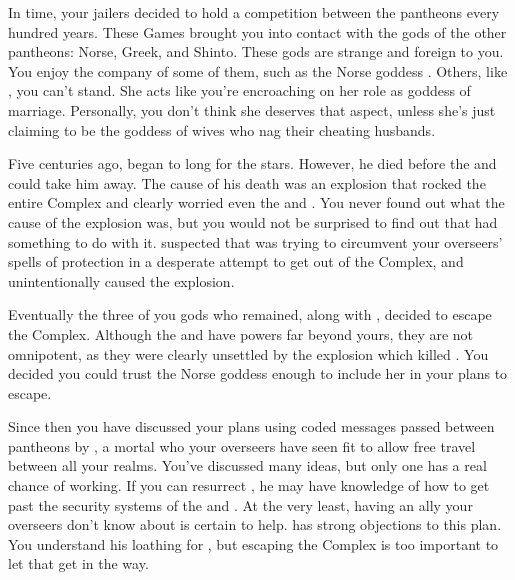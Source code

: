 \documentclass[char]{guardians}
\begin{document}

In time, your jailers decided to hold a competition between the pantheons every hundred years. These Games brought you into contact with the gods of the other pantheons: Norse, Greek, and Shinto. These gods are strange and foreign to you. You enjoy the company of some of them, such as the Norse goddess \cHel{}. Others, like \cHera{}, you can't stand. She acts like you're encroaching on her role as goddess of marriage. Personally, you don't think she deserves that aspect, unless she's just claiming to be the goddess of wives who nag their cheating husbands.


Five centuries ago, \cSet{} began to long for the stars. However, he died before the \cWarden{} and \cCaretaker{} could take him away. The cause of his death was an explosion that rocked the entire Complex and clearly worried even the \cWarden{} and \cCaretaker{}. You never found out what the cause of the explosion was, but you would not be surprised to find out that \cOsiris{} had something to do with it. \cAnubis{} suspected that \cSet{} was trying to circumvent your overseers' spells of protection in a desperate attempt to get out of the Complex, and unintentionally caused the explosion.

Eventually the three of you gods who remained, along with \cEgyptianHuman{}, decided to escape the Complex. Although the \cWarden{} and \cCaretaker{} have powers far beyond yours, they are not omnipotent, as they were clearly unsettled by the explosion which killed \cSet{}.
You decided you could trust the Norse goddess \cHel{} enough to include her in your plans to escape.

Since then you have discussed your plans using coded messages passed between pantheons by \cJascha{}, a mortal who your overseers have seen fit to allow free travel between all your realms. You've discussed many ideas, but only one has a real chance of working. If you can resurrect \cSet{}, he may have knowledge of how to get past the security systems of the \cWarden{} and \cCaretaker{}. At the very least, having an ally your overseers don't know about is certain to help. \cOsiris{} has strong objections to this plan. You understand his loathing for \cSet{}, but escaping the Complex is too important to let that get in the way.

\end{document}
